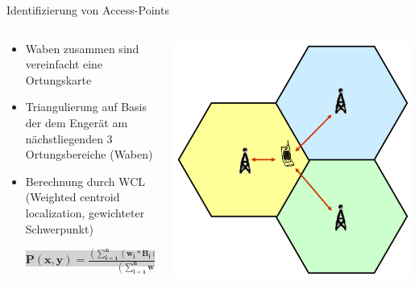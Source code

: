\begin{frame}{Identifizierung von Access-Points}
  \begin{columns}
  \begin{column}{.5\textwidth}
  \begin{itemize}
  \vspace{-.4cm}
  \item Waben zusammen sind vereinfacht eine Ortungskarte
  \item Triangulierung auf Basis der dem Engerät am nächstliegenden 3 Ortungsbereiche (Waben)
  \item Berechnung durch WCL (Weighted centroid localization, gewichteter Schwerpunkt)\\ %
  \begin{Large}
  \colorbox{lightgray}{$\mathbf{P(x,y) = \frac{(\sum_{i=1}^n (w_i * B_i(x,y)))}{(\sum_{i=1}^n w_i)}}$}
  \end{Large}
  \end{itemize}  
  \end{column}
  \begin{column}{.45\textwidth}
  \begin{center}
  	\vspace{-.8cm}
    \includegraphics[scale=.15]{images/triangulierung.png}\\

\end{center}
\end{column}
\end{columns}
\end{frame}
